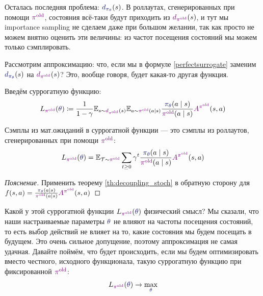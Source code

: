 Осталась последняя проблема: $\textcolor{ChadBlue}{d_{\pi_{\theta}}}(s)$. В роллаутах, сгенерированных при помощи $\textcolor{ChadPurple}{\pi^{\old}}$, состояния всё-таки будут приходить из $\textcolor{ChadPurple}{d_{\pi^{\old}}}(s)$, и тут мы importance sampling не сделаем даже при большом желании, так как просто не можем внятно оценить эти величины: из частот посещения состояний мы можем только сэмплировать.

Рассмотрим аппроксимацию: что, если мы в формуле \eqref{perfectsurrogate} заменим $\textcolor{ChadBlue}{d_{\pi_{\theta}}}(s)$ на $\textcolor{ChadPurple}{d_{\pi^{\old}}}(s)$? Это, вообще говоря, будет какая-то другая функция.

\begin{definition}
Введём суррогатную функцию:
\begin{equation}\label{surrogate}
L_{\textcolor{ChadPurple}{\pi^{\old}}}(\textcolor{ChadBlue}{\theta}) \coloneqq \frac{1}{1 - \gamma}\E_{s \sim \textcolor{ChadPurple}{d_{\pi^{\old}}}(s)} \E_{a \sim \textcolor{ChadPurple}{\pi^{\old}}(a \mid s)} \frac{\textcolor{ChadBlue}{\pi_\theta}(a \mid s)}{\textcolor{ChadPurple}{\pi^{\old}}(a \mid s)} \textcolor{ChadPurple}{A^{\pi^{\old}}}(s, a)   
\end{equation}
\end{definition}

\begin{proposition}
Сэмплы из мат.ожиданий в суррогатной функции --- это сэмплы из роллаутов, сгенерированных при помощи $\textcolor{ChadPurple}{\pi^{\old}}$:
\begin{equation*}
L_{\textcolor{ChadPurple}{\pi^{\old}}}(\textcolor{ChadBlue}{\theta}) = \E_{\Traj \sim \textcolor{ChadPurple}{\pi^{\old}}} \sum_{t \ge 0} \gamma^t \frac{\textcolor{ChadBlue}{\pi_\theta}(a \mid s)}{\textcolor{ChadPurple}{\pi^{\old}}(a \mid s)} \textcolor{ChadPurple}{A^{\pi^{\old}}}(s, a)
\end{equation*}
\begin{proof}[Пояснение]
Применить теорему \ref{th:decoupling_stoch} в обратную сторону для $f(s, a) \HM= \frac{\textcolor{ChadBlue}{\pi_\theta}(a \mid s)}{\textcolor{ChadPurple}{\pi^{\old}}(a \mid s)} \textcolor{ChadPurple}{A^{\pi^{\old}}}(s, a)$
\end{proof}
\end{proposition}

Какой у этой суррогатной функции $L_{\textcolor{ChadPurple}{\pi^{\old}}}(\textcolor{ChadBlue}{\theta})$ физический смысл? Мы сказали, что наши настраиваемые параметры $\textcolor{ChadBlue}{\theta}$ не влияют на частоты посещения состояний, то есть выбор действий не влияет на то, какие состояния мы будем посещать в будущем. Это очень сильное допущение, поэтому аппроксимация не самая удачная. Давайте поймём, что будет происходить, если мы будем оптимизировать вместо честного, исходного функционала, такую суррогатную функцию при фиксированной $\textcolor{ChadPurple}{\pi^{\old}}$:
\begin{equation}\label{surrogate_opt}
L_{\textcolor{ChadPurple}{\pi^{\old}}}(\textcolor{ChadBlue}{\theta}) \to \max_{\textcolor{ChadBlue}{\theta}}
\end{equation}

